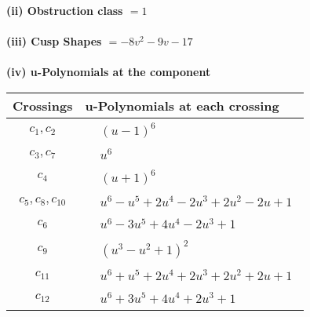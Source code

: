 \documentclass[1p]{elsarticle_modified}
\theoremstyle{definition}
\begin{document}
\flushleft \textbf{(ii) Obstruction class $= 1$}\\~\\
\flushleft \textbf{(iii) Cusp Shapes $= -8 v^2-9 v-17$}\\~\\
\newpage\renewcommand{\arraystretch}{1}
\flushleft \textbf{(iv) u-Polynomials at the component}\newline \\
\begin{tabular}{m{50pt}|m{274pt}}
Crossings & \hspace{64pt}u-Polynomials at each crossing \\
\hline $$\begin{aligned}c_{1},c_{2}\end{aligned}$$&$\begin{aligned}
&(u-1)^6
\end{aligned}$\\
\hline $$\begin{aligned}c_{3},c_{7}\end{aligned}$$&$\begin{aligned}
&u^6
\end{aligned}$\\
\hline $$\begin{aligned}c_{4}\end{aligned}$$&$\begin{aligned}
&(u+1)^6
\end{aligned}$\\
\hline $$\begin{aligned}c_{5},c_{8},c_{10}\end{aligned}$$&$\begin{aligned}
&u^6- u^5+2 u^4-2 u^3+2 u^2-2 u+1
\end{aligned}$\\
\hline $$\begin{aligned}c_{6}\end{aligned}$$&$\begin{aligned}
&u^6-3 u^5+4 u^4-2 u^3+1
\end{aligned}$\\
\hline $$\begin{aligned}c_{9}\end{aligned}$$&$\begin{aligned}
&(u^3- u^2+1)^2
\end{aligned}$\\
\hline $$\begin{aligned}c_{11}\end{aligned}$$&$\begin{aligned}
&u^6+u^5+2 u^4+2 u^3+2 u^2+2 u+1
\end{aligned}$\\
\hline $$\begin{aligned}c_{12}\end{aligned}$$&$\begin{aligned}
&u^6+3 u^5+4 u^4+2 u^3+1
\end{aligned}$\\
\hline
\end{tabular}\\~\\
\end{document}
